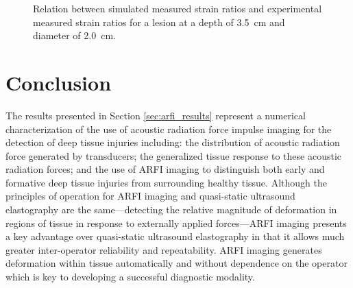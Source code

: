 			\begin{figure}[!htb]
				\centering
				\caption[Experimental validation of ARFI imaging model results]{Relation between simulated measured strain ratios and experimental measured strain ratios for a lesion at a depth of \SI{3.5}{\cm} and diameter of \SI{2.0}{\cm}.}
				\label{fig:arfi_phantom_validation}
			\end{figure}

	\section{Conclusion}
		The results presented in Section \ref{sec:arfi_results} represent a numerical characterization of the use of acoustic radiation force impulse imaging for the detection of deep tissue injuries including: the distribution of acoustic radiation force generated by transducers; the generalized tissue response to these acoustic radiation forces; and the use of ARFI imaging to distinguish both early and formative deep tissue injuries from surrounding healthy tissue. Although the principles of operation for ARFI imaging and quasi-static ultrasound elastography are the same---detecting the relative magnitude of deformation in regions of tissue in response to externally applied forces---ARFI imaging presents a key advantage over quasi-static ultrasound elastography in that it allows much greater inter-operator reliability and repeatability. ARFI imaging generates deformation within tissue automatically and without dependence on the operator which is key to developing a successful diagnostic modality.

